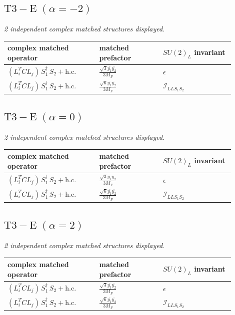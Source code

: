 \documentclass[9pt]{article}
\begin{document}
\subsection*{$ \mathrm{T3-E}\;(\alpha=-2) $}
\textit{2 independent complex matched structures displayed. }
\begin{longtable}{@{}p{0.36\linewidth}p{0.25\linewidth}p{0.29\linewidth}@{}}
\toprule
complex matched operator & matched prefactor & $SU(2)_L$ invariant \\
\midrule
$ (L_i^T C L_j)\,S_1^\dagger\,S_2+\mathrm{h.c.} $ & $ \frac{\sqrt{3} \overline{y_{1}} \overline{y_{2}}}{3 M_F} $ & $ \epsilon $ \\
$ (L_i^T C L_j)\,S_1^\dagger\,S_2+\mathrm{h.c.} $ & $ \frac{\sqrt{6} \overline{y_{1}} \overline{y_{2}}}{3 M_F} $ & $ \mathcal{I}_{LLS_1S_2} $ \\
\bottomrule
\end{longtable}
\subsection*{$ \mathrm{T3-E}\;(\alpha=0) $}
\textit{2 independent complex matched structures displayed. }
\begin{longtable}{@{}p{0.36\linewidth}p{0.25\linewidth}p{0.29\linewidth}@{}}
\toprule
complex matched operator & matched prefactor & $SU(2)_L$ invariant \\
\midrule
$ (L_i^T C L_j)\,S_1^\dagger\,S_2+\mathrm{h.c.} $ & $ \frac{\sqrt{3} \overline{y_{1}} \overline{y_{2}}}{3 M_F} $ & $ \epsilon $ \\
$ (L_i^T C L_j)\,S_1^\dagger\,S_2+\mathrm{h.c.} $ & $ \frac{\sqrt{6} \overline{y_{1}} \overline{y_{2}}}{3 M_F} $ & $ \mathcal{I}_{LLS_1S_2} $ \\
\bottomrule
\end{longtable}
\subsection*{$ \mathrm{T3-E}\;(\alpha=2) $}
\textit{2 independent complex matched structures displayed. }
\begin{longtable}{@{}p{0.36\linewidth}p{0.25\linewidth}p{0.29\linewidth}@{}}
\toprule
complex matched operator & matched prefactor & $SU(2)_L$ invariant \\
\midrule
$ (L_i^T C L_j)\,S_1^\dagger\,S_2+\mathrm{h.c.} $ & $ \frac{\sqrt{3} \overline{y_{1}} \overline{y_{2}}}{3 M_F} $ & $ \epsilon $ \\
$ (L_i^T C L_j)\,S_1^\dagger\,S_2+\mathrm{h.c.} $ & $ \frac{\sqrt{6} \overline{y_{1}} \overline{y_{2}}}{3 M_F} $ & $ \mathcal{I}_{LLS_1S_2} $ \\
\bottomrule
\end{longtable}
\end{document}
